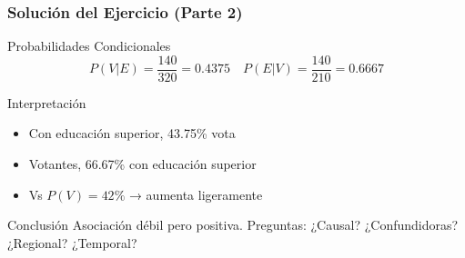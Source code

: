 \documentclass[aspectratio=169,11pt]{beamer}
\begin{document}
\begin{frame}[fragile]
\frametitle{Solución del Ejercicio (Parte 2)}

\small

\begin{block}{Probabilidades Condicionales}
$$P(V|E) = \frac{140}{320} = 0.4375 \quad P(E|V) = \frac{140}{210} = 0.6667$$
\end{block}

\pause
\vspace{0.15cm}
\begin{block}{Interpretación}
\begin{itemize}
  \item Con educación superior, 43.75\% vota
  \item Votantes, 66.67\% con educación superior
  \item Vs $P(V) = 42\%$ → aumenta ligeramente
\end{itemize}
\end{block}

\pause
\begin{alertblock}{Conclusión}
Asociación débil pero positiva. Preguntas: ¿Causal? ¿Confundidoras? ¿Regional? ¿Temporal?
\end{alertblock}
\end{frame}
\end{document}
